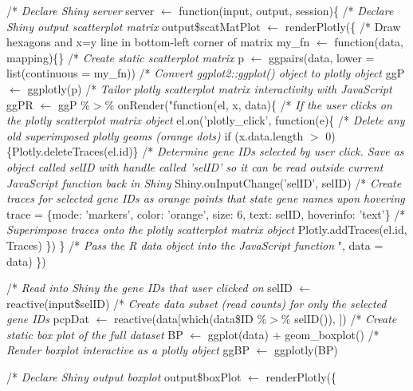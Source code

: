 \documentclass[parskip=full]{bmcart}
\begin{document}
\DontPrintSemicolon
\begin{algorithm}[H]
\SetAlgoLined
{}

/* \textit{Declare Shiny server}\;
server $\leftarrow$ function(input, output, session)\{\;
\Indp/* \textit{Declare Shiny output scatterplot matrix}\;
output\$scatMatPlot $\leftarrow$ renderPlotly(\{\;
\Indp\Indp/* Draw hexagons and x=y line in bottom-left corner of matrix\;
my\_fn $\leftarrow$ function(data, mapping)\{\}\;
/* \textit{Create static scatterplot matrix}\;
p $\leftarrow$ ggpairs(data, lower = list(continuous = my\_fn))\;
/* \textit{Convert ggplot2::ggplot() object to plotly object}\;
ggP $\leftarrow$ ggplotly(p)\;
/* \textit{Tailor plotly scatterplot matrix interactivity with JavaScript}\;
ggPR $\leftarrow$ ggP \%$>$\% onRender("function(el, x, data)\{\;
\Indp/* \textit{If the user clicks on the plotly scatterplot matrix object}\;
el.on('plotly\_click', function(e)\{\;
\Indp/* \textit{Delete any old superimposed plotly geoms (orange dots)}\;
if (x.data.length $>$ 0)\{Plotly.deleteTraces(el.id)\}\;
/* \textit{Determine gene IDs selected by user click. Save as object called selID with handle called 'selID' so it can be read outside current JavaScript function back in Shiny}\;
Shiny.onInputChange('selID', selID)\;
/* \textit{Create traces for selected gene IDs as orange points that state gene names upon hovering}\;
trace = \{mode: 'markers', color: 'orange', size: 6, text: selID, hoverinfo: 'text'\}\;
/* \textit{Superimpose traces onto the plotly scatterplot matrix object}\;
Plotly.addTraces(el.id, Traces)\;
\Indm\})\;
\Indm\}\;
/* \textit{Pass the R data object into the JavaScript function}\;
", data = data)\;
\Indm\})\;

\BlankLine

/* \textit{Read into Shiny the gene IDs that user clicked on}\;
selID $\leftarrow$ reactive(input\$selID)\;
/* \textit{Create data subset (read counts) for only the selected gene IDs}\;
pcpDat $\leftarrow$ reactive(data[which(data\$ID \%$>$\% selID()), ])\;
/* \textit{Create static box plot of the full dataset}\;
BP $\leftarrow$ ggplot(data) $+$ geom\_boxplot()\;
/* \textit{Render boxplot interactive as a plotly object}\;
ggBP $\leftarrow$ ggplotly(BP)\;

\BlankLine

/* \textit{Declare Shiny output boxplot}\;
output\$boxPlot $\leftarrow$ renderPlotly(\{\;


\end{algorithm}
\end{document}
